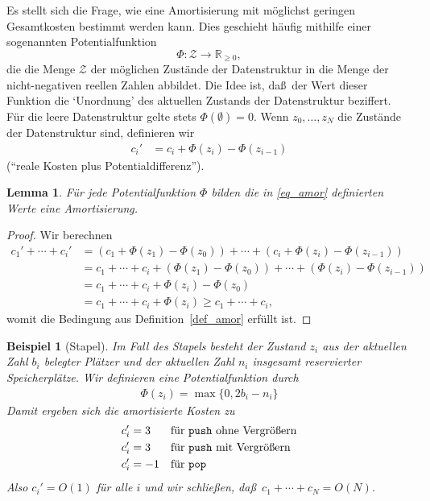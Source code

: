 \documentclass[10pt,reqno]{amsart}
\numberwithin{equation}{section}
\newcommand\cZ{\mathcal Z}
\newtheorem{example}[definition]{Beispiel}
\newtheorem{lemma}[definition]{Lemma}
\begin{document}
Es stellt sich die Frage, wie eine Amortisierung mit m\"oglichst geringen Gesamtkosten bestimmt werden kann.
Dies geschieht h\"aufig mithilfe einer sogenannten Potentialfunktion
	$$\Phi:\mathcal Z\to\mathbb R_{\geq0},$$
die die Menge $\cZ$ der m\"oglichen Zust\"ande der Datenstruktur in die Menge der nicht-negativen reellen Zahlen abbildet.
Die Idee ist, da\ss\ der Wert dieser Funktion die `Unordnung' des aktuellen Zustands der Datenstruktur beziffert.
F\"ur die leere Datenstruktur gelte stets $\Phi(\emptyset)=0$.
Wenn $z_0,\ldots,z_N$ die Zust\"ande der Datenstruktur sind, definieren wir
\begin{align}\label{eq_amor}
		c_i'&=c_i+\Phi(z_i)-\Phi(z_{i-1})
	\end{align}
(``reale Kosten plus Potentialdifferenz'').

\begin{lemma}\label{lem_amor}
	F\"ur jede Potentialfunktion $\Phi$ bilden die in \eqref{eq_amor} definierten Werte eine Amortisierung.
\end{lemma}
\begin{proof}
	Wir berechnen
	\begin{align*}
		c_1'+\cdots+c_i'&=(c_1+\Phi(z_1)-\Phi(z_0))+\cdots+(c_i+\Phi(z_i)-\Phi(z_{i-1}))\\
						&=c_1+\cdots+c_i+(\Phi(z_1)-\Phi(z_0))+\cdots+(\Phi(z_i)-\Phi(z_{i-1}))\\
						&=c_1+\cdots+c_i+\Phi(z_i)-\Phi(z_0)\\
						&=c_1+\cdots+c_i+\Phi(z_i)\geq c_1+\cdots+c_i,
	\end{align*}
	womit die Bedingung aus Definition~\ref{def_amor} erf\"ullt ist.
\end{proof}

\begin{example}[Stapel]
	Im Fall des Stapels besteht der Zustand $z_i$ aus der aktuellen Zahl $b_i$ belegter Pl\"atzer und der aktuellen Zahl $n_i$ insgesamt reservierter Speicherpl\"atze.
			Wir definieren eine Potentialfunktion durch
				\begin{align*}
					\Phi(z_i)=\max\{0,2b_i-n_i\}
				\end{align*}
			Damit ergeben sich die amortisierte Kosten zu
				\begin{align*}
					c_i'&=3&&\mbox{f\"ur {\tt push} ohne Vergr\"o\ss ern}\\
					c_i'&=3&&\mbox{f\"ur {\tt push} mit Vergr\"o\ss ern}\\
					c_i'&=-1&&\mbox{f\"ur {\tt pop}}
				\end{align*}
			Also $c_i'=O(1)$ f\"ur alle $i$ und wir schlie\ss en, da\ss\ $c_1+\cdots+c_N=O(N)$.
\end{example}
\end{document}
